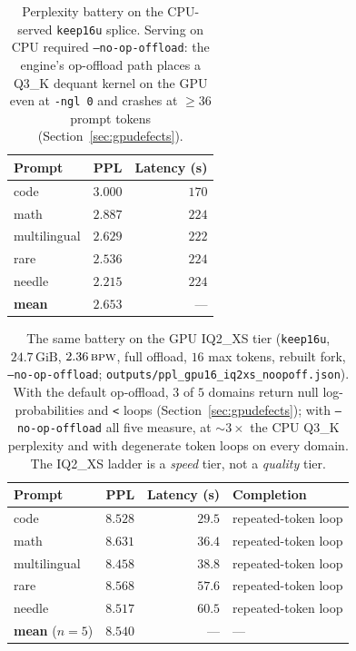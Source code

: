 \documentclass[11pt]{article}
\newcommand{\keepm}[1]{\texttt{keep#1}}
\newcommand{\code}[1]{\texttt{#1}}
\newcommand{\bpw}{\,\textsc{bpw}}
\newcommand{\gib}{\,\textrm{GiB}}
\begin{document}
\begin{table}[t]
\centering
\small
\begin{tabular}{lrr}
\toprule
\textbf{Prompt} & \textbf{PPL} & \textbf{Latency (s)} \\
\midrule
code         & $3.000$ & $170$ \\
math         & $2.887$ & $224$ \\
multilingual & $2.629$ & $222$ \\
rare         & $2.536$ & $224$ \\
needle       & $2.215$ & $224$ \\
\midrule
\textbf{mean} & $\mathbf{2.653}$ & --- \\
\bottomrule
\end{tabular}
\caption{Perplexity battery on the CPU-served \keepm{16u} splice. Serving on CPU
required \code{--no-op-offload}: the engine's op-offload path places a Q3\_K
dequant kernel on the GPU even at \code{-ngl 0} and crashes at $\ge36$ prompt
tokens (Section~\ref{sec:gpudefects}).}
\label{tab:ppl}
\end{table}

\begin{table}[t]
\centering
\small
\begin{tabular}{lrrl}
\toprule
\textbf{Prompt} & \textbf{PPL} & \textbf{Latency (s)} & \textbf{Completion} \\
\midrule
code         & $8.528$ & $29.5$ & repeated-token loop \\
math         & $8.631$ & $36.4$ & repeated-token loop \\
multilingual & $8.458$ & $38.8$ & repeated-token loop \\
rare         & $8.568$ & $57.6$ & repeated-token loop \\
needle       & $8.517$ & $60.5$ & repeated-token loop \\
\midrule
\textbf{mean} ($n{=}5$) & $\mathbf{8.540}$ & --- & --- \\
\bottomrule
\end{tabular}
\caption{The same battery on the GPU IQ2\_XS tier (\keepm{16u}, $24.7\gib{}$,
$2.36\bpw{}$, full offload, $16$ max tokens, rebuilt fork,
\code{--no-op-offload}; \code{outputs/ppl\_gpu16\_iq2xs\_noopoff.json}). With
the default op-offload, $3$ of $5$ domains return null log-probabilities and
\code{<} loops (Section~\ref{sec:gpudefects}); with \code{--no-op-offload} all
five measure, at ${\sim}3\times$ the CPU Q3\_K perplexity and with degenerate
token loops on every domain. The IQ2\_XS ladder is a \emph{speed} tier, not a
\emph{quality} tier.}
\label{tab:pplgpu}
\end{table}
\end{document}
